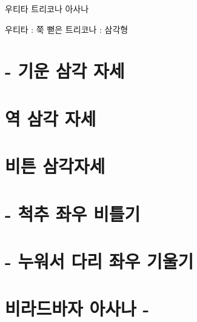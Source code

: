 \documentclass[12pt, a4paper, oneside]{book}
\let\stdsection\section
\renewcommand\section{\newpage\stdsection}
\begin{document}
			우티타 트리코나 아사나


		우티타 : 쭉 뻗은
		트리코나 : 삼각형



			\section{ - 기운 삼각 자세 }
		
			\section{ 역 삼각 자세 }
		
		
			\section{  비튼 삼각자세 }


%
%
%
	\section{ - 척추 좌우 비틀기}



%
%
%
	\section{ - 누워서 다리 좌우 기울기}



%
%
%
	\section{비라드바자 아사나 - }
\end{document}
